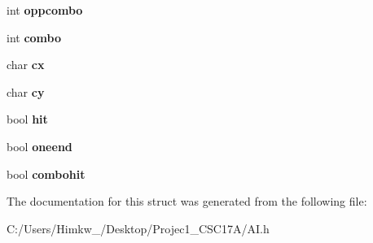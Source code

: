 \begin{DoxyCompactItemize}
\item 
\hypertarget{struct_a_i_g_a3af226bb3a5d0d8c4ebabb157aefb2a1}{int {\bfseries oppcombo}}\label{struct_a_i_g_a3af226bb3a5d0d8c4ebabb157aefb2a1}

\item 
\hypertarget{struct_a_i_g_ac066e44fd07e5e8715b7efdde87ceaa0}{int {\bfseries combo}}\label{struct_a_i_g_ac066e44fd07e5e8715b7efdde87ceaa0}

\item 
\hypertarget{struct_a_i_g_af74862608d8567ba100d08b753fbc8aa}{char {\bfseries cx}}\label{struct_a_i_g_af74862608d8567ba100d08b753fbc8aa}

\item 
\hypertarget{struct_a_i_g_a078fbb4d8ac1543efbc3b183ede3a40e}{char {\bfseries cy}}\label{struct_a_i_g_a078fbb4d8ac1543efbc3b183ede3a40e}

\item 
\hypertarget{struct_a_i_g_af179dc06d00332705f936444df0b668c}{bool {\bfseries hit}}\label{struct_a_i_g_af179dc06d00332705f936444df0b668c}

\item 
\hypertarget{struct_a_i_g_a1a3566a8dc803713d2b1d2456a1fbfc4}{bool {\bfseries oneend}}\label{struct_a_i_g_a1a3566a8dc803713d2b1d2456a1fbfc4}

\item 
\hypertarget{struct_a_i_g_ae3ef22184dd2acc2a6d668a4648847df}{bool {\bfseries combohit}}\label{struct_a_i_g_ae3ef22184dd2acc2a6d668a4648847df}

\end{DoxyCompactItemize}


The documentation for this struct was generated from the following file\+:\begin{DoxyCompactItemize}
\item 
C\+:/\+Users/\+Himkw\+\_/\+Desktop/\+Projec1\+\_\+\+C\+S\+C17\+A/A\+I.\+h\end{DoxyCompactItemize}

